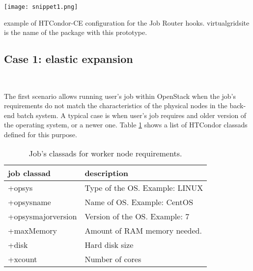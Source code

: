 \documentclass[a4paper]{jpconf}
\begin{document}

\begin{snippet}[h]
    \renewcommand\figurename{Snippet}
    \centering
    \texttt{[image: snippet1.png]}
    \caption{example of HTCondor-CE configuration for the Job Router hooks. virtualgridsite is the name of the package with this prototype.}
    \label{snip:snippet1}
\end{snippet}


\subsection{Case 1: elastic expansion}

~

The first scenario allows running user's job within OpenStack when
the job's requirements do not match the characteristics of the physical nodes in
the back-end batch system.
A typical case is when user's job requires and older version of the operating
system, or a newer one.
Table \ref{table:classad1} shows a list of HTCondor classads defined for this purpose.


\begin{table}[H]
\centering
\begin{tabular}{ l l }
  \hline
  \textbf{job classad} & \textbf{description} \\
  \hline
  +opsys & Type of the OS. Example: LINUX  \\
  +opsysname & Name of OS. Example: CentOS \\
  +opsysmajorversion & Version of the OS. Example: 7 \\
  +maxMemory & Amount of RAM memory needed. \\
  +disk & Hard disk size \\
  +xcount & Number of cores \\
  \hline
\end{tabular}
\caption{Job's classads for worker node requirements.}
\label{table:classad1}
\end{table}
\end{document}
